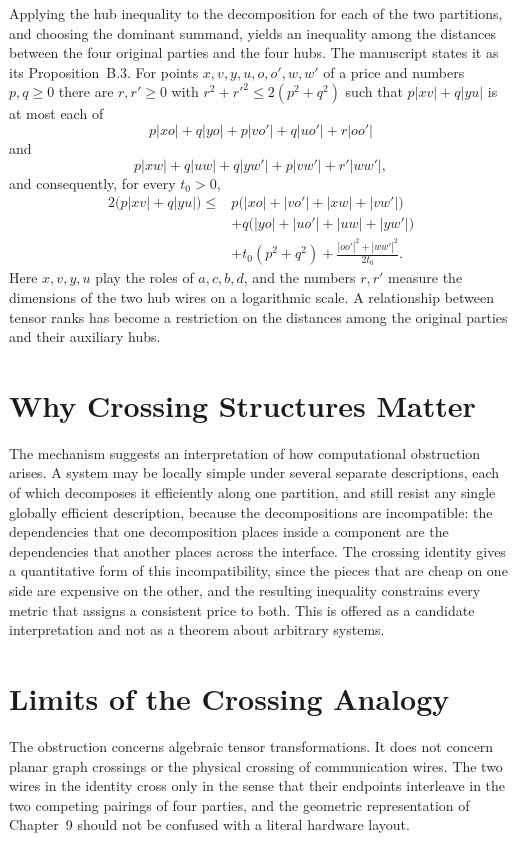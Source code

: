 \documentclass[11pt,letterpaper]{report}
\theoremstyle{plain}
\theoremstyle{definition}
\theoremstyle{remark}
\begin{document}
Applying the hub inequality to the decomposition for each of the two partitions, and choosing the dominant summand, yields an inequality among the distances between the four original parties and the four hubs. The manuscript states it as its Proposition~B.3. For points $x,v,y,u,o,o',w,w'$ of a price and numbers $p,q\ge0$ there are $r,r'\ge0$ with $r^2+r'^2\le2(p^2+q^2)$ such that $p|xv|+q|yu|$ is at most each of
\[
p|xo|+q|yo|+p|vo'|+q|uo'|+r|oo'|
\]
and
\[
p|xw|+q|uw|+q|yw'|+p|vw'|+r'|ww'|,
\]
and consequently, for every $t_0>0$,
\[
\begin{aligned}
2\bigl(p|xv|+q|yu|\bigr)\le{}&p\bigl(|xo|+|vo'|+|xw|+|vw'|\bigr)\\
&+q\bigl(|yo|+|uo'|+|uw|+|yw'|\bigr)\\
&+t_0(p^2+q^2)+\frac{|oo'|^2+|ww'|^2}{2t_0}.
\end{aligned}
\]
Here $x,v,y,u$ play the roles of $a,c,b,d$, and the numbers $r,r'$ measure the dimensions of the two hub wires on a logarithmic scale. A relationship between tensor ranks has become a restriction on the distances among the original parties and their auxiliary hubs.

\section{Why Crossing Structures Matter}

The mechanism suggests an interpretation of how computational obstruction arises. A system may be locally simple under several separate descriptions, each of which decomposes it efficiently along one partition, and still resist any single globally efficient description, because the decompositions are incompatible: the dependencies that one decomposition places inside a component are the dependencies that another places across the interface. The crossing identity gives a quantitative form of this incompatibility, since the pieces that are cheap on one side are expensive on the other, and the resulting inequality constrains every metric that assigns a consistent price to both. This is offered as a candidate interpretation and not as a theorem about arbitrary systems.

\section{Limits of the Crossing Analogy}

The obstruction concerns algebraic tensor transformations. It does not concern planar graph crossings or the physical crossing of communication wires. The two wires in the identity cross only in the sense that their endpoints interleave in the two competing pairings of four parties, and the geometric representation of Chapter~9 should not be confused with a literal hardware layout.
\end{document}
